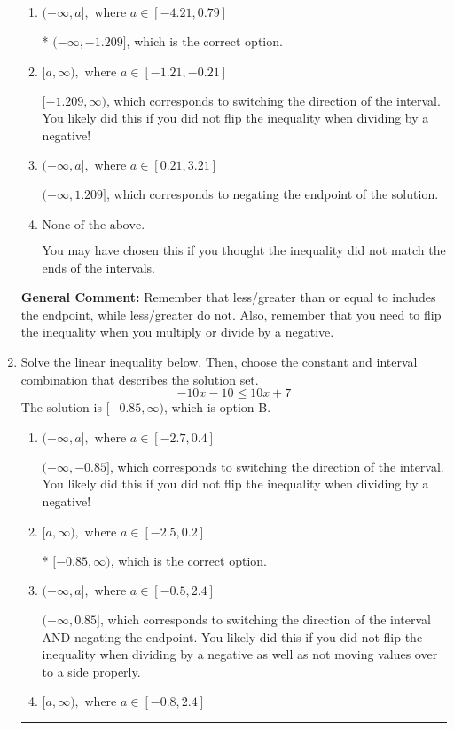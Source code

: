 \documentclass{extbook}[14pt]
\newcommand{\litem}[1]{\item #1

\rule{\textwidth}{0.4pt}}
\begin{document}
\begin{enumerate}
{\begin{enumerate}[label=\Alph*.]
 $[1.209, \infty)$, which corresponds to switching the direction of the interval AND negating the endpoint. You likely did this if you did not flip the inequality when dividing by a negative as well as not moving values over to a side properly.
\item \( (-\infty, a], \text{ where } a \in [-4.21, 0.79] \)

* $(-\infty, -1.209]$, which is the correct option.
\item \( [a, \infty), \text{ where } a \in [-1.21, -0.21] \)

 $[-1.209, \infty)$, which corresponds to switching the direction of the interval. You likely did this if you did not flip the inequality when dividing by a negative!
\item \( (-\infty, a], \text{ where } a \in [0.21, 3.21] \)

 $(-\infty, 1.209]$, which corresponds to negating the endpoint of the solution.
\item \( \text{None of the above}. \)

You may have chosen this if you thought the inequality did not match the ends of the intervals.
\end{enumerate}

\textbf{General Comment:} Remember that less/greater than or equal to includes the endpoint, while less/greater do not. Also, remember that you need to flip the inequality when you multiply or divide by a negative.
}
\litem{
Solve the linear inequality below. Then, choose the constant and interval combination that describes the solution set.
\[ -10x -10 \leq 10x + 7 \]The solution is \( [-0.85, \infty) \), which is option B.\begin{enumerate}[label=\Alph*.]
\item \( (-\infty, a], \text{ where } a \in [-2.7, 0.4] \)

 $(-\infty, -0.85]$, which corresponds to switching the direction of the interval. You likely did this if you did not flip the inequality when dividing by a negative!
\item \( [a, \infty), \text{ where } a \in [-2.5, 0.2] \)

* $[-0.85, \infty)$, which is the correct option.
\item \( (-\infty, a], \text{ where } a \in [-0.5, 2.4] \)

 $(-\infty, 0.85]$, which corresponds to switching the direction of the interval AND negating the endpoint. You likely did this if you did not flip the inequality when dividing by a negative as well as not moving values over to a side properly.
\item \( [a, \infty), \text{ where } a \in [-0.8, 2.4] \)


\end{enumerate}}
\end{enumerate}
\end{document}

